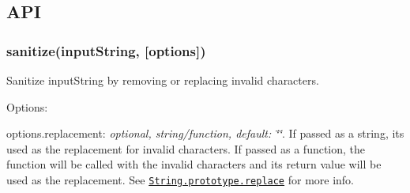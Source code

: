 \subsection*{A\+PI}

\subsubsection*{{\ttfamily sanitize(input\+String, \mbox{[}options\mbox{]})}}

Sanitize {\ttfamily input\+String} by removing or replacing invalid characters.

Options\+:


\begin{DoxyItemize}
\item {\ttfamily options.\+replacement}\+: {\itshape optional, string/function, default\+: {\ttfamily \char`\"{}\char`\"{}}}. If passed as a string, it\textquotesingle{}s used as the replacement for invalid characters. If passed as a function, the function will be called with the invalid characters and it\textquotesingle{}s return value will be used as the replacement. See \href{https://developer.mozilla.org/en-US/docs/Web/JavaScript/Reference/Global_Objects/String/replace}{\tt {\ttfamily String.\+prototype.\+replace}} for more info. 
\end{DoxyItemize}